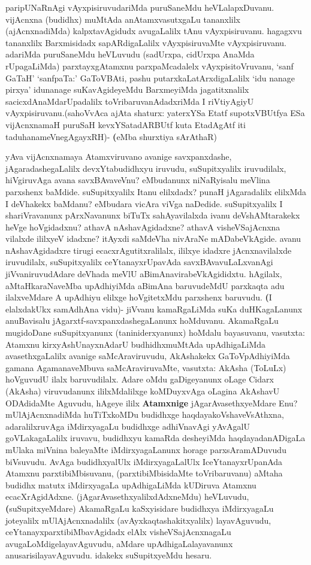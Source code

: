 \begin{artha}
paripUNaRnAgi vAyxpisiruvudariMda puruSaneMdu
heVLalapxDuvanu. vijAcnxna (budidhx) muMtAda anAtamxvasutxgaLu
tananxlilx (ajAcnxnadiMda) kalpxtavAgidudx avugaLalilx tAnu
vAyxpisiruvanu. hagagxvu tananxlilx Barxmisidadx sapARdigaLalilx
vAyxpisiruvaMte vAyxpisiruvanu. adariMda puruSaneMdu heVLuvudu
(sadUrxpa, cidUrxpa AnaMda rUpagaLiMda) parxtayxgAtamxnu
parxpaMcadalelx vAyxpisitoVruvanu, `sanf GaTaH' `sanfpaTa:' GaToVBAti,
pashu putarxkaLatArxdigaLalilx `idu nanage pirxya' idunanage
suKavAgideyeMdu BarxmeyiMda jagatitxnalilx sacicxdAnaMdarUpadalilx
toVribaruvanAdadxriMda I riVtiyAgiyU vAyxpisiruvanu.(sahoVvAca ajAta
shaturx: yaterxYSa Etatf supotxV\s BUtfya ESa vijAcnxnamaH puruSaH
kevxYSatadARBUtf kuta EtadAgAtf iti taduhanameVnegAgayxRH)-
\textbf(eMba shurxtiya sArAthaR)
\end{artha}

\begin{artha}
yAva vijAcnxnamaya Atamxviruvano avanige savxpanxdashe,
jAgaradashegaLalilx devxYtabudidhxyu iruvudu, suSupitxyalilx
iruvudilalx, hiVgiruvAga avana savxBAvaveVnu? eMbudanunx niNaRyisalu
meVlina parxshenx baMdide. suSupitxyalilx Itanu elilxdadx? punaH
jAgaradalilx elilxMda I deVhakekx baMdanu? eMbudara vicAra viVga
naDedide. suSupitxyalilx I shariVravanunx pArxNavanunx biTuTx
sahAyavilalxda ivanu deVshAMtarakekx heVge hoVgidadxnu? athavA
nAshavAgidadxne? athavA visheVSajAcnxna vilalxde ililxyeV idadxne?
itAyxdi saMdeVha nivAraNe mADabeVkAgide. avanu nAshavAgidadxre tirugi
ecacxrAgutitxralilalx, ililxye idadxre jAcnxnavilalxde iruvudilalx,
suSupitxyalilx ceYtanayxrUpavAda savxBAvavuLaLxvanAgi
jiVvaniruvudAdare deVhada meVlU aBimAnavirabeVkAgididxtu. hAgilalx,
aMtaHkaraNaveMba upAdhiyiMda aBimAna baruvudeMdU parxkaqta adu
ilalxveMdare  A upAdhiyu elilxge hoVgitetxMdu parxshenx
baruvudu. \textbf(I elalxdakUkx samAdhAna vidu)- jiVvanu kamaRgaLiMda
suKa duHKagaLanunx anuBavisalu jAgarxtf-savxpanxdashegaLanunx
hoMduvanu. AkamaRgaLu mugidoDane suSupitxyanunx (taniniderxyanunx)
hoMdalu bayasuvanu, vasutxta: Atamxnu kirxyAshUnayxnAdarU
budhidhxmuMtAda upAdhigaLiMda avasethxgaLalilx avanige
saMcAraviruvudu, AkAshakekx GaToVpAdhiyiMda gamana AgamanaveMbuva
saMcAraviruvaMte, vasutxta: AkAsha (ToLuLx) hoVguvudU ilalx
baruvudilalx. Adare oMdu gaDigeyanunx oLage Cidarx (AkAsha) viruvudanunx
ililxMdalilxge koMDuyxvAga oLagina  AkAshavU ODAdidaMte Aguvudu, hAgeye
ililx \textbf{Atamxnige} jAgarAvasethxyeMdare Enu? mUlAjAcnxnadiMda
huTiTxkoMDu budidhxge haqdayakoVshaveVsAthxna, adaralilxruvAga
iMdirxyagaLu budidhxge adhiVnavAgi yAvAgalU goVLakagaLalilx iruvavu,
budidhxyu kamaRda desheyiMda haqdayadanADigaLa mUlaka miVnina
baleyaMte iMdirxyagaLanunx horage parxsAramADuvudu biVsuvudu. AvAga
budidhxyalUlx iMdirxyagaLalUlx IceYtanayxrUpanAda Atamxnu
parxtibiMbisuvanu, (parxtibiMbisidaMte toVribaruvanu) aMtaha budidhx
matutx iMdirxyagaLa upAdhigaLiMda kUDiruva Atamxnu
ecacXrAgidAdxne. (jAgarAvasethxyalilxdAdxneMdu) heVLuvudu,
 \textbf(suSupitxyeMdare) AkamaRgaLu kaSxyisidare budidhxya
iMdirxyagaLu joteyalilx mUlAjAcnxnadalilx (avAyxkaqtashakitxyalilx)
layavAguvudu, ceYtanayxparxtibiMbavAgidadx elAlx visheVSajAcnxnagaLu
avugaLoMdigelayavAguvudu, aMdare upAdhigaLalayavanunx
anusarisilayavAguvudu. idakekx suSupitxyeMdu hesaru.
\end{artha}

